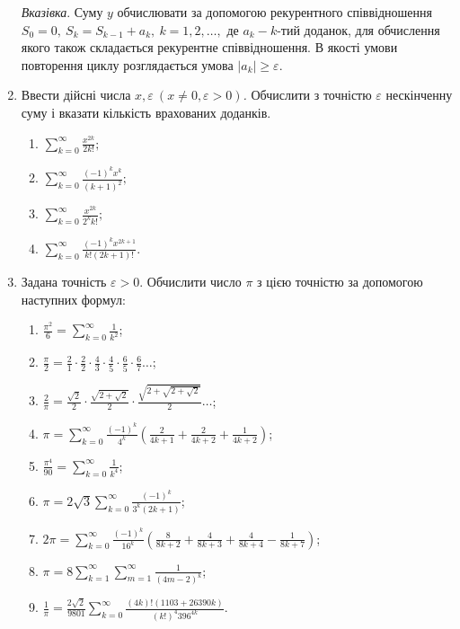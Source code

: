 \documentclass[]{article}
\makeatletter
\newcommand{\xslalph}[1]{\expandafter\@xslalph\csname c@#1\endcsname}
\newcommand{\@xslalph}[1]{%
    \ifcase#1\or а\or б\or в\or г\or д\or e\or є\or ж\or з\or i%
    \or й\or к\or л\or м\or н\or о\or п\or р\or с\or т%
    \or у\or ф\or х\or ц\or ч\or ш\or ю\or я\or аа\or бб\or вв %
    \else\@ctrerr\fi%
}
\makeatother
\begin{document}
\begin{enumerate}
\begin{enumerate}[label=\xslalph*)]
\end{enumerate}

\emph{\emph{Вказівка}}. Суму $y$ обчислювати за допомогою
рекурентного співвідношення
\(S_{0} = 0,\ S_{k} = S_{k - 1} + a_{k},\ k = 1,2,\ldots,\) де
\(a_{k} - k\)-тий доданок, для обчислення якого також складається
рекурентне співвідношення. В якості умови повторення циклу розглядається
умова \(\left| a_{k} \right| \geq \varepsilon.\)

\item
  Ввести дійсні числа
  \(x,\varepsilon\ (x \neq 0,\varepsilon > 0)\)\emph{.} Обчислити з
  точністю \(\varepsilon\) нескінченну суму і вказати кількість
  врахованих доданків.
\begin{enumerate}[label=\xslalph*)]
\item \(\sum\limits_{k = 0}^{\infty}\frac{x^{2k}}{2k!};\) 
\item \(\sum\limits_{k = 0}^{\infty}\frac{( - 1)^{k}x^{k}}{(k + 1)^{2}};\)
\item \(\sum\limits_{k = 0}^{\infty}\frac{x^{2k}}{2^{k}k!};\) 
\item \(\sum\limits_{k = 0}^{\infty}\frac{( - 1)^{k}x^{2k + 1}}{k!(2k + 1)!}.\)
\end{enumerate}

\item 
 
 Задана точність $\varepsilon>0$. Обчислити число $\pi$ 
з цією точністю за допомогою наступних формул:
  \begin{enumerate}[label=\xslalph*)]
\item
 $ \frac{\pi^2}{6} = \sum\limits_{k=0}^{\infty} \frac{1}{k^2} $;
\item
 $\frac{\pi}{2} = \frac{2}{1} \cdot \frac{2}{2} \cdot \frac{4}{3} \cdot \frac{4}{5} \cdot \frac{6}{5}\cdot \frac{6}{7} \ldots $;
\item
$\frac{2}{\pi} = \frac{\sqrt{2}}{2} \cdot \frac{\sqrt{2 + \sqrt{2}}}{2} \cdot \frac{\sqrt{2 + \sqrt{2+\sqrt{2}}}}{2} \ldots $;
\item
$\pi = \sum\limits_{k=0}^{\infty} \frac{(-1)^{k}}{4^{k}}\left( \frac{2}{4k+1} + \frac{2}{4k+2} + \frac{1}{4k+2}\right)$;
\item
 $ \frac{\pi^4}{90} = \sum\limits_{k=0}^{\infty} \frac{1}{k^4} $;
\item
 $ \pi = 2\sqrt{3} \sum\limits_{k=0}^{\infty} \frac{(-1)^{k}}{3^{k}(2k+1)} $;
\item
$ 2\pi = \sum\limits_{k=0}^{\infty} \frac{(-1)^{k}}{16^{k}}\left( \frac{8}{8k+2} + \frac{4}{8k+3} + \frac{4}{8k+4}  - \frac{1}{8k+7}\right)$;
\item
$ \pi = 8 \sum\limits_{k=1}^{\infty} \sum\limits_{m=1}^{\infty} \frac{1}{(4m-2)^{k}} $;
\item
$ \frac{1}{\pi} = \frac{2 \sqrt{2}}{9801} \sum\limits_{k=0}^{\infty}  \frac{(4k)!(1103 +26390k)}{(k!)^{4}396^{4k}} $.

  \end{enumerate}

\end{enumerate}
\end{document}
